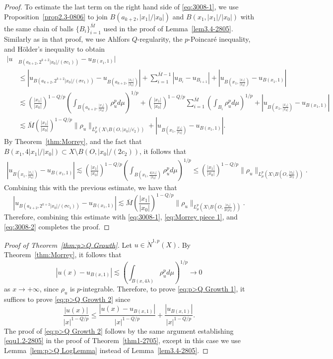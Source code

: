 \documentclass[10pt]{amsart}
\numberwithin{equation}{section}
\begin{document}
\begin{proof}
To estimate the last term on the right hand side of \eqref{eq:3008-1}, we use Proposition~\ref{prop2.3-0806} to join $B(a_{k+2},|x_1|/|x_0|)$ and $B(x_1,|x_1|/|x_0|)$ with the same chain of balls $\{B_i\}_{i=1}^{\overline M}$ used in the proof of Lemma~\ref{lem3.4-2805}.  Similarly as in that proof, we use Ahlfors $Q$-regularity, the $p$-Poincar\'e inequality, and  H\"older's inequality to obtain
\begin{align*}
 |u&_{B(a_{k+2},2^{k+2}|x_0|/(\sigma c_1))}-u_{B(x_1,1)}|\\
 &\le|u_{B(a_{k+2},2^{k+2}|x_0|/(\sigma c_1))}-u_{B(a_{k+2},\frac{|x_1|}{|x_0|})}|+\sum_{i=1}^{\overline{M}-1}|u_{B_i}-u_{B_{i+1}}|+|u_{B(x_1,\frac{|x_1|}{|x_0|})}-u_{B(x_1,1)}|\\
&\lesssim\left(\frac{|x_1|}{|x_0|}\right)^{1-Q/p}\left(\int_{B(a_{k+2},\frac{|x_1|}{|x_0|})}\rho_u^pd\mu\right)^{1/p}+\left(\frac{|x_1|}{|x_0|}\right)^{1-Q/p}\sum_{i=1}^{\overline M}\left(\int_{B_i}\rho_u^pd\mu\right)^{1/p}+|u_{B(x_1,\frac{|x_1|}{|x_0|})}-u_{B(x_1,1)}|\\
&\lesssim \overline M\left(\frac{|x_1|}{|x_0|}\right)^{1-Q/p}\|\rho_u\|_{L^p_\mu(X\setminus B(O,|x_0|/\overline{c_2}))}+|u_{B(x_1,\frac{|x_1|}{|x_0|})}-u_{B(x_1,1)}|.   
\end{align*}
By Theorem~\ref{thm:Morrey}, and the fact that $B(x_1,4|x_1|/|x_0|)\subset X\setminus B(O,|x_0|/(2c_2))$, it follows that 
\begin{align*}
    |u_{B(x_1,\frac{|x_1|}{|x_0|})}-u_{B(x_1,1)}|\lesssim\left(\frac{|x_1|}{|x_0|}\right)^{1-Q/p}\left(\int_{B(x_1,\frac{4|x_1|}{|x_0|})}\rho_u^pd\mu\right)^{1/p}\le\left(\frac{|x_1|}{|x_0|}\right)^{1-Q/p}\|\rho_u\|_{L^p_\mu\left(X\setminus B\left(O,\frac{|x_0|}{2c_2}\right)\right)}.
\end{align*}
Combining this with the previous estimate, we have that 
\[
|u_{B(a_{k+2},2^{k+2}|x_0|/(\sigma c_1))}-u_{B(x_1,1)}|\lesssim\overline M\left(\frac{|x_1|}{|x_0|}\right)^{1-Q/p}\|\rho_u\|_{L^p_\mu\left(X\setminus B\left(O,\frac{|x_0|}{2\overline c_2c_2}\right)\right)}.
\]
Therefore, combining this estimate with \eqref{eq:3008-1}, \eqref{eq:Morrey piece 1}, and \eqref{eq:3008-2} completes the proof.    
\end{proof}

\begin{proof}[Proof of Theorem~\ref{thm:p>Q Growth}]

Let $u\in\dot N^{1,p}(X)$.  By Theorem~\ref{thm:Morrey}, it follows that 
\[
|u(x)-u_{B(x,1)}|\lesssim\left(\int_{B(x,4\lambda)}\rho_u^pd\mu\right)^{1/p}\to 0
\]
as $x\to+\infty$, since $\rho_u$ is $p$-integrable.  Therefore, to prove \eqref{eq:p>Q Growth 1}, it suffices to prove \eqref{eq:p>Q Growth 2} since 
\[
\frac{|u(x)|}{|x|^{1-Q/p}}\le\frac{|u(x)-u_{B(x,1)}|}{|x|^{1-Q/p}}+\frac{|u_{B(x,1)}|}{|x|^{1-Q/p}}.
\]
The proof of \eqref{eq:p>Q Growth 2} follows by the same argument establishing \eqref{equ1.2-2805} in the proof of Theorem~\ref{thm1-2705}, except in this case we use Lemma~\ref{lem:p>Q LogLemma} instead of Lemma~\ref{lem3.4-2805}.
\end{proof}
\end{document}
